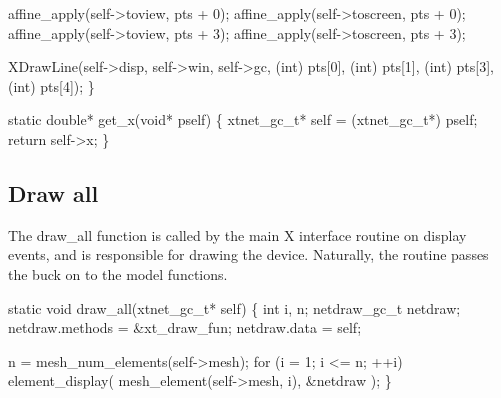    affine_apply(self->toview,   pts + 0);
    affine_apply(self->toscreen, pts + 0);    
    affine_apply(self->toview,   pts + 3);
    affine_apply(self->toscreen, pts + 3);

    XDrawLine(self->disp, self->win, self->gc, 
              (int) pts[0], (int) pts[1], (int) pts[3], (int) pts[4]);
\}

\nwendcode{}\nwdocspar

\nwenddocs{}\plusendmoddef\nwstartdeflinemarkup{}\nwenddeflinemarkup
static double* get_x(void* pself)
\{
    xtnet_gc_t* self = (xtnet_gc_t*) pself;
    return self->x;
\}

\nwendcode{}\nwdocspar


\subsection{Draw all}

The {\Tt{}draw{\_}all\nwendquote} function is called by the main X interface routine
on display events, and is responsible for drawing the device.
Naturally, the routine passes the buck on to the model functions.

\nwenddocs{}\endmoddef\nwstartdeflinemarkup{}\nwenddeflinemarkup
static void draw_all(xtnet_gc_t* self)
\{
    int i, n;
    netdraw_gc_t netdraw;
    netdraw.methods = &xt_draw_fun;
    netdraw.data    = self;

    n = mesh_num_elements(self->mesh);
    for (i = 1; i <= n; ++i)
        element_display( mesh_element(self->mesh, i), &netdraw );
\}

\nwendcode{}\nwdocspar


